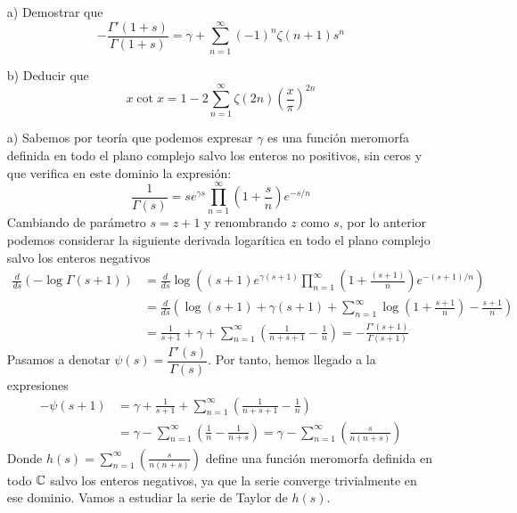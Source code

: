 \documentclass[twoside]{article}
\begin{document}
\newpage

\begin{ejercicio}{4}
\begin{itemize}
\item[]
\item[a)] Demostrar que
$$
-\frac{\Gamma'(1+s)}{\Gamma(1+s)} = \gamma + \sum_{n=1}^\infty (-1)^n\zeta(n+1)s^n
$$
\item[b)] Deducir que
$$
x\cot x = 1 - 2\sum_{n=1}^\infty\zeta(2n)\left(\frac{x}{\pi}\right)^{2n}
$$
\end{itemize}
\end{ejercicio}
\begin{sol}
\begin{itemize}
\item[]
\item[a)] Sabemos por teoría que podemos expresar $\gamma$ es una función meromorfa definida en todo el plano complejo salvo los enteros no positivos, sin ceros y que verifica en este dominio la expresión:
\[ \frac{1}{Γ(s)} = s e^{γs} \prod_{n=1}^{∞} \left(1 + \frac{s}{n}\right) e^{-s/n} \]
Cambiando de parámetro $s=z+1$ y renombrando $z$ como $s$, por lo anterior podemos considerar la siguiente derivada logarítica en todo el plano complejo salvo los enteros negativos
\begin{align*}
\frac{d}{ds}\left(-\log \Gamma(s+1)\right) &=  \frac{d}{ds}\log\left((s+1) e^{γ(s+1)} \prod_{n=1}^{∞} \left(1 + \frac{(s+1)}{n}\right) e^{-(s+1)/n}\right)\\
&= \frac{d}{ds}\left( \log(s+1)+\gamma(s+1)+\sum_{n=1}^\infty \log\left(1+\frac{s+1}{n}\right)-\frac{s+1}{n}\right)\\
&= \frac{1}{s+1} +\gamma + \sum_{n=1}^\infty \left(\frac{1}{n+s+1}-\frac{1}{n}\right)= -\frac{\Gamma'(s+1)}{\Gamma(s+1)}
\end{align*}
Pasamos a denotar $\psi(s) = \dfrac{\Gamma'(s)}{\Gamma(s)}$. Por tanto, hemos llegado a la expresiones
\begin{align*}
-\psi(s+1) &= \gamma+\frac{1}{s+1} + \sum_{n=1}^\infty \left(\frac{1}{n+s+1}-\frac{1}{n}\right)\\
& = \gamma -\sum_{n=1}^\infty \left(\frac{1}{n} - \frac{1}{n+s}\right) = \gamma -\sum_{n=1}^\infty \left(\frac{s}{n(n+s)}\right) 
\end{align*}
Donde $h(s)=\sum_{n=1}^\infty \left(\frac{s}{n(n+s)}\right)$ define una función meromorfa definida en todo $\mathbb{C}$ salvo los enteros negativos, ya que la serie converge trivialmente en ese dominio. Vamos a estudiar la serie de Taylor de $h(s)$.
\begin{align*}

\end{align*}
\end{itemize}
\end{sol}
\end{document}
